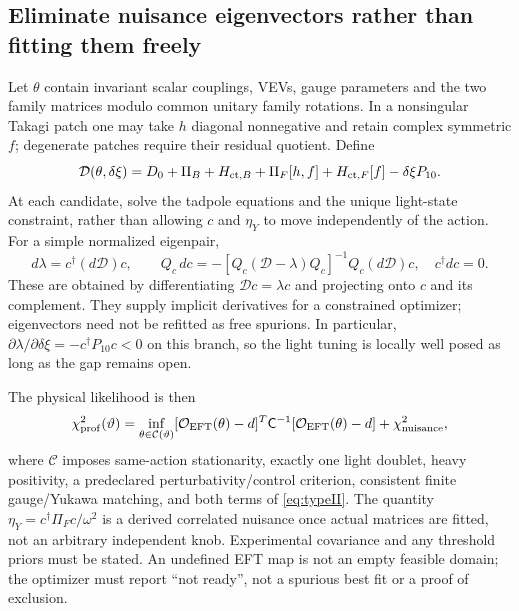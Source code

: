 \documentclass[11pt]{article}
\begin{document}
\subsection{Eliminate nuisance eigenvectors rather than fitting them freely}
Let $\theta$ contain invariant scalar couplings, VEVs, gauge parameters and
the two family matrices modulo common unitary family rotations. In a
nonsingular Takagi patch one may take $h$ diagonal nonnegative and retain
complex symmetric $f$; degenerate patches require their residual quotient.
Define
\begin{equation}
 \mathcal D(\theta,\delta\xi)=D_0+\Pi_B+H_{{\rm ct},B}
 +\Pi_F[h,f]+H_{{\rm ct},F}[f]-\delta\xi P_{10}.
\end{equation}
At each candidate, solve the tadpole equations and the unique light-state
constraint, rather than allowing $c$ and $\eta_Y$ to move independently of
the action. For a simple normalized eigenpair,
\begin{equation}
 d\lambda=c^\dagger(d\mathcal D)c,\qquad
 Q_c\,dc=-[Q_c(\mathcal D-\lambda)Q_c]^{-1}
 Q_c(d\mathcal D)c,\quad c^\dagger dc=0.
\end{equation}
These are obtained by differentiating $\mathcal D c=\lambda c$ and
projecting onto $c$ and its complement. They supply implicit derivatives
for a constrained optimizer; eigenvectors need not be refitted as free
spurions. In particular,
$\partial\lambda/\partial\delta\xi=-c^\dagger P_{10}c<0$ on this branch,
so the light tuning is locally well posed as long as the gap remains open.

The physical likelihood is then
\begin{equation}
 \chi^2_{\rm prof}(\vartheta)=
 \inf_{\theta\in\mathcal C(\vartheta)}
 [\mathcal O_{\rm EFT}(\theta)-d]^T\mathsf C^{-1}
 [\mathcal O_{\rm EFT}(\theta)-d]+\chi^2_{\rm nuisance},
\end{equation}
where $\mathcal C$ imposes same-action stationarity, exactly one light
doublet, heavy positivity, a predeclared perturbativity/control criterion,
consistent finite gauge/Yukawa matching, and both terms of
\eqref{eq:typeII}. The quantity $\eta_Y=c^\dagger\Pi_Fc/\omega^2$ is a
derived correlated nuisance once actual matrices are fitted, not an
arbitrary independent knob. Experimental covariance and any threshold
priors must be stated. An undefined EFT map is not an empty feasible
domain; the optimizer must report ``not ready'', not a spurious best fit
or a proof of exclusion.
\end{document}
